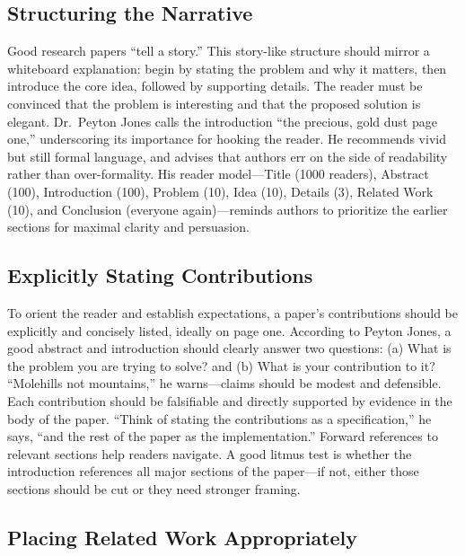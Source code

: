 \subsection*{Structuring the Narrative}

Good research papers ``tell a story.''
This story-like structure should mirror a whiteboard explanation: begin by stating the problem and why it matters, then introduce the core idea, followed by supporting details.
The reader must be convinced that the problem is interesting and that the proposed solution is elegant.
Dr.\ Peyton Jones calls the introduction ``the precious, gold dust page one,'' underscoring its importance for hooking the reader.
He recommends vivid but still formal language, and advises that authors err on the side of readability rather than over-formality.
His reader model---Title (1000 readers), Abstract (100), Introduction (100), Problem (10), Idea (10), Details (3), Related Work (10), and Conclusion (everyone again)---reminds authors to prioritize the earlier sections for maximal clarity and persuasion.

\subsection*{Explicitly Stating Contributions}

To orient the reader and establish expectations, a paper's contributions should be explicitly and concisely listed, ideally on page one.
According to Peyton Jones, a good abstract and introduction should clearly answer two questions: (a) What is the problem you are trying to solve? and (b) What is your contribution to it?
``Molehills not mountains,'' he warns---claims should be modest and defensible.
Each contribution should be falsifiable and directly supported by evidence in the body of the paper.
``Think of stating the contributions as a specification,'' he says, ``and the rest of the paper as the implementation.''
Forward references to relevant sections help readers navigate.
A good litmus test is whether the introduction references all major sections of the paper---if not, either those sections should be cut or they need stronger framing.

\subsection*{Placing Related Work Appropriately}


